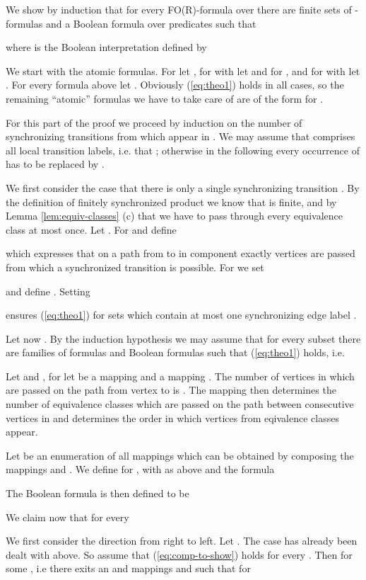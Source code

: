 \documentclass{LMCS}
\begin{document}
We show by induction that for every FO(R)-formula over  there are finite sets 
 of -formulas and a Boolean 
formula  over predicates  
such that 

where  is the Boolean interpretation defined by 

We start with the atomic formulas. For  let , for  
with  let  and  for , and
for  with  let . 
For every formula above let . Obviously (\ref{eq:theo1}) holds in all cases, so the remaining
``atomic'' formulas we have to take care of are of the form 
for . 

For this part of the proof we proceed by induction on the number of synchronizing transitions from 
 which appear in . We may assume that  comprises all local transition labels,
i.e. that ; otherwise in the following every occurrence of  has to be 
replaced by .

We first consider the case that there is only a single synchronizing 
transition . By the definition of finitely synchronized 
product 
we know that  is 
finite, and by Lemma   \ref{lem:equiv-classes} (c) that we have to pass through every equivalence class
at most once. Let . For  and  define

which expresses that on a path from  to  in component  exactly  vertices 
are passed from which a synchronized transition is possible.
For  we set 

and define . 
Setting 
 
ensures (\ref{eq:theo1}) for sets  which contain at most one synchronizing edge label .

Let now . By the induction hypothesis we may assume that for every subset  
there are families of formulas  and Boolean formulas 
 such that (\ref{eq:theo1}) holds, i.e.

Let  and , 
for  let  be a mapping 
and  a mapping .
The number of vertices in  which are passed on the path from vertex  to  is . The 
mapping  then determines the number of  equivalence classes which are passed on the path 
between consecutive vertices in  and  determines the order in which vertices from  
eqivalence classes appear.

Let  be an enumeration of all mappings which can be obtained by composing the mappings 
 and . We define for ,  with  as above 
and  the formula

The Boolean formula  is then defined to be 


We claim now that for every 


We first consider the direction from right to left. Let .
The case  has already been dealt with above. So assume that (\ref{eq:comp-to-show}) holds 
for every . Then  for
some , i.e there exits an  and mappings 
and  such that
for 
\end{document}
